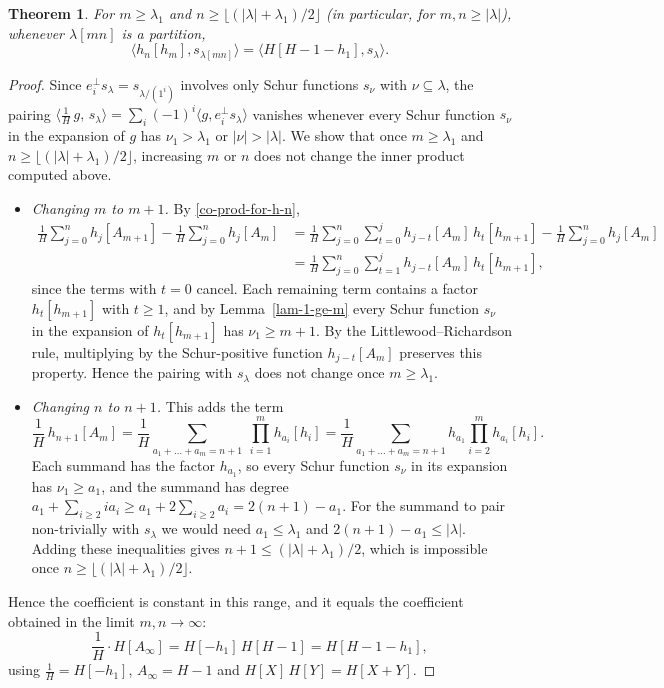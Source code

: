 \documentclass[reqno]{amsart}
\theoremstyle{plain}
\newtheorem{theorem}{Theorem}[section]
\theoremstyle{definition}
\theoremstyle{remark}
\theoremstyle{plain}
\begin{document}
\begin{theorem}\label{thm-perp}
For $m\ge\lambda_1$ and $n\ge\lfloor(|\lambda|+\lambda_1)/2\rfloor$
(in particular, for $m,n\ge|\lambda|$), whenever $\lambda[mn]$ is a partition,
$$\langle h_n[h_m],s_{\lambda[mn]}\rangle=\langle H[H-1-h_1], s_\lambda\rangle.$$
\end{theorem}
\begin{proof}
Since $e_i^\perp s_\lambda=s_{\lambda/(1^i)}$ involves only Schur functions
$s_\nu$ with $\nu\subseteq\lambda$, the pairing
$\big\langle \frac1H\, g,\, s_\lambda\big\rangle=\sum_i(-1)^i\langle g, e_i^\perp s_\lambda\rangle$
vanishes whenever every Schur function $s_\nu$ in the expansion of $g$ has
$\nu_1>\lambda_1$ or $|\nu|>|\lambda|$. We show that once $m\ge\lambda_1$ and
$n\ge\lfloor(|\lambda|+\lambda_1)/2\rfloor$, increasing $m$ or $n$ does not
change the inner product computed above.

\begin{itemize}
\item \emph{Changing $m$ to $m+1$.} By \eqref{co-prod-for-h-n},
\begin{align*}
\frac{1}{H}\sum_{j=0}^{n}h_j[A_{m+1}]- \frac{1}{H}\sum_{j=0}^{n}h_j[A_m]
&=\frac{1}{H}\sum_{j=0}^n\sum_{t=0}^{j} h_{j-t}[A_m]\, h_t[h_{m+1}]-\frac{1}{H}\sum_{j=0}^{n}h_j[A_m]\\
&=\frac{1}{H}\sum_{j=0}^{n}\sum_{t=1}^{j} h_{j-t}[A_m]\, h_t[h_{m+1}],
\end{align*}
since the terms with $t=0$ cancel. Each remaining term contains a factor
$h_t[h_{m+1}]$ with $t\ge1$, and by Lemma~\ref{lam-1-ge-m} every Schur
function $s_\nu$ in the expansion of $h_t[h_{m+1}]$ has $\nu_1\ge m+1$. By the
Littlewood--Richardson rule, multiplying by the Schur-positive function
$h_{j-t}[A_m]$ preserves this property. Hence the pairing with $s_\lambda$ does
not change once $m\ge\lambda_1$.

\item \emph{Changing $n$ to $n+1$.} This adds the term
$$\frac1H\,h_{n+1}[A_m]=\frac1H\sum_{a_1+\dots+a_m=n+1}\ \prod_{i=1}^m h_{a_i}[h_i]
=\frac1H\sum_{a_1+\dots+a_m=n+1}h_{a_1}\prod_{i=2}^mh_{a_i}[h_i].$$
Each summand has the factor $h_{a_1}$, so every Schur function $s_\nu$ in its
expansion has $\nu_1\ge a_1$, and the summand has degree
$a_1+\sum_{i\ge 2}ia_i\ge a_1+2\sum_{i\ge 2}a_i=2(n+1)-a_1$. For the summand to
pair non-trivially with $s_\lambda$ we would need $a_1\le\lambda_1$ and
$2(n+1)-a_1\le |\lambda|$. Adding these inequalities gives
$n+1\le (|\lambda|+\lambda_1)/2$, which is impossible once
$n\ge\lfloor(|\lambda|+\lambda_1)/2\rfloor$.
\end{itemize}

Hence the coefficient is constant in this range, and it equals the coefficient
obtained in the limit $m,n\to\infty$:
$$\frac1H\cdot H[A_\infty]=H[-h_1]\,H[H-1]=H[H-1-h_1],$$
using $\frac1H=H[-h_1]$, $A_\infty=H-1$ and $H[X]\,H[Y]=H[X+Y]$.
\end{proof}
\end{document}
